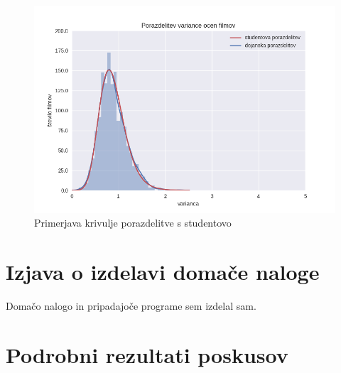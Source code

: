 \documentclass[a4paper,11pt]{article}
\begin{document}
\begin{figure}[htbp]
\begin{center}
\includegraphics[scale=0.7]{porazdelitevStudent.png}
\caption{Primerjava krivulje porazdelitve s studentovo}
\label{slika4}
\end{center}
\end{figure}



\section{Izjava o izdelavi domače naloge}
Domačo nalogo in pripadajoče programe sem izdelal sam.

\appendix
\appendixpage
\section{\label{app-res}Podrobni rezultati poskusov}

\end{document}
